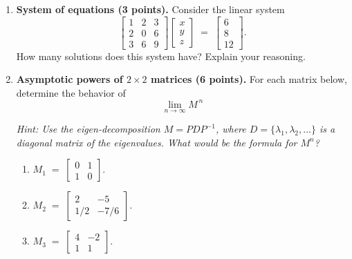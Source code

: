 \documentclass[11pt]{article}
\begin{document}
\begin{enumerate}[label=\arabic*., resume]

    \item \textbf{System of equations (3 points).}
          Consider the linear system
          \[
             \begin{bmatrix}
                 1 & 2 & 3\\
                 2 & 0 & 6\\
                 3 & 6 & 9
             \end{bmatrix}
             \begin{bmatrix}x\\ y\\ z\end{bmatrix}
             \;=\;
             \begin{bmatrix} 6 \\ 8 \\ 12 \end{bmatrix}.
          \]
          How many solutions does this system have?  Explain your reasoning.

          \newpage

    \item \textbf{Asymptotic powers of $2\times2$ matrices (6 points).}
For each matrix below, determine the behavior of 
\[
    \lim_{n\to\infty} M^{\,n}
\]

\textit{Hint: Use the eigen-decomposition $M = P D P^{-1}$, where $D = \{\lambda_1, \lambda_2, ...\}$ is a diagonal matrix of the eigenvalues. What would be the formula for $M^n$?}

\begin{enumerate}[label=(\alph*)]
    \item
    $\displaystyle
       M_1 \;=\;
       \begin{bmatrix}
           0 & 1\\
           1 & 0
       \end{bmatrix}.
     $

    \item
    $\displaystyle
       M_2 \;=\;
       \begin{bmatrix}
           2 & -5\\
           1/2 & -7/6
       \end{bmatrix}.
     $
    

    \item
    $\displaystyle
       M_3 \;=\;
       \begin{bmatrix}
           4 & -2\\
           1 & 1
       \end{bmatrix}.
     $
    

\end{enumerate}
\end{enumerate}
\end{document}
